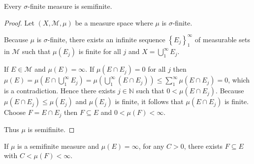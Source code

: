 \newpage

\begin{exercise}
    Every \( \sigma \)-finite measure is semifinite.
\end{exercise}

\begin{proof}
    Let \( (X, \mathcal{M}, \mu) \) be a measure space where \( \mu \) is \( \sigma \)-finite.

    Because \( \mu \) is \( \sigma \)-finite, there exists an infinite sequence \( {\left\{ E_{j} \right\}}_{1}^{\infty} \) of measurable sets in \( \mathcal{M} \) such that \( \mu(E_{j}) \) is finite for all \( j \) and \( X = \bigcup_{1}^{\infty} E_{j} \).

    If \( E \in \mathcal{M} \) and \( \mu(E) = \infty \). If \( \mu(E \cap E_{j}) = 0 \) for all \( j \) then \( \mu(E) = \mu\left( E \cap \bigcup_{1}^{\infty} E_{j} \right) = \mu\left( \bigcup_{1}^{\infty} (E \cap E_{j}) \right) \le \sum_{1}^{\infty} \mu(E \cap E_{j}) = 0 \), which is a contradiction. Hence there exists \( j \in \mathbb{N} \) such that \( 0 < \mu(E \cap E_{j}) \). Because \( \mu(E \cap E_{j}) \le \mu(E_{j}) \) and \( \mu(E_{j}) \) is finite, it follows that \( \mu(E \cap E_{j}) \) is finite. Choose \( F = E \cap E_{j} \) then \( F \subseteq E \) and \( 0 < \mu(F) < \infty \).

    Thus \( \mu \) is semifinite.
\end{proof}

\newpage

\begin{exercise}
    If \( \mu \) is a semifinite measure and \( \mu(E) = \infty \), for any \( C > 0 \), there exists \( F \subseteq E \) with \( C < \mu(F) < \infty \).
\end{exercise}

